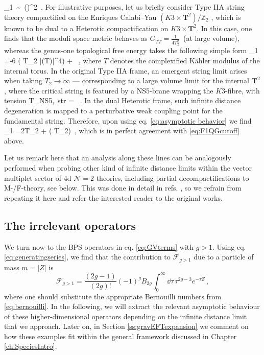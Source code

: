 	_1\, \sim\, \left(\frac{\Mpf}{\LSP}\right)^2\, .
\eeq
%
For illustrative purposes, let us briefly consider Type IIA string theory compactified on the Enriques Calabi--Yau $\left(K3 \times \mathbf{T}^2\right)/\mathbb{Z}_2$ \cite{Klemm:2005pd}, which is known to be dual to a Heterotic compactification on $K3 \times \mathbf{T}^2$. In this case, one finds that the moduli space metric behaves as $G_{T \bar{T}}=\frac{1}{4 T_2^2}\, $ (at large volume), whereas the genus-one topological free energy takes the following simple form \cite{vandeHeisteeg:2023ubh,Grimm:2007tm}
%
\beq \label{4dtopologicalfreeenergy}
_1 =-6 \log \left( T_2 |\eta(T)|^4\right) + \, , 
\eeq
%
where $T$ denotes the complexified K\"ahler modulus of the internal torus. In the original Type IIA frame, an emergent string limit arises when taking $T_2 \to \infty$ --- corresponding to a large volume limit for the internal $\mathbf{T}^2$, where the critical string is featured by a NS5-brane wrapping the $K3$-fibre, with tension
%
\beq
	T_{\rm NS5,\, str} = \, .
\label{eq:hettensionEnriques}
\eeq
%
In the dual Heterotic frame, such infinite distance degeneration is mapped to a perturbative weak coupling point for the fundamental string. Therefore, upon using eq. \eqref{eq:asymptotic behavior} we find
%
\beq
{}_1 =2\pi T_2 + \left( \log T_2\right)\, , 
\eeq
%
which is in perfect agreement with \eqref{eq:F1QGcutoff} above.

Let us remark here that an analysis along these lines can be analogously performed when probing other kind of infinite distance limits within the vector multiplet sector of 4d $\mathcal{N}=2$ theories, including partial decompactifications to M-/F-theory, see below. This was done in detail in refs. \cite{vandeHeisteeg:2022btw,vandeHeisteeg:2023ubh}, so we refrain from repeating it here and refer the interested reader to the original works.

\subsection{The irrelevant operators}
\label{ss:UVconvergent}

We turn now to the BPS operators in eq. \eqref{eq:GVterms} with $g>1$. Using eq. \eqref{eq:generatingseries}, we find that the contribution to $\mathcal{F}_{g>1}$ due to a particle of mass $m= |Z|$ is
%
\begin{equation}
\label{eq:Fg>1}
	\mathcal{F}_{g>1}= \frac{(2g-1)}{(2g)!} (-1)^g B_{2g} \int_0^{\infty} \dd\tau\, \tau^{2g-3}e^{-\tau Z}\, ,
\end{equation}
%
where one should substitute the appropriate Bernouilli numbers from \eqref{eq:bernouilli}. In the following, we will extract the relevant asymptotic behaviour of these higher-dimensional operators depending on the infinite distance limit that we approach. Later on, in Section \ref{ss:gravEFTexpansion} we comment on how these examples fit within the general framework discussed in Chapter \ref{ch:SpeciesIntro}.

